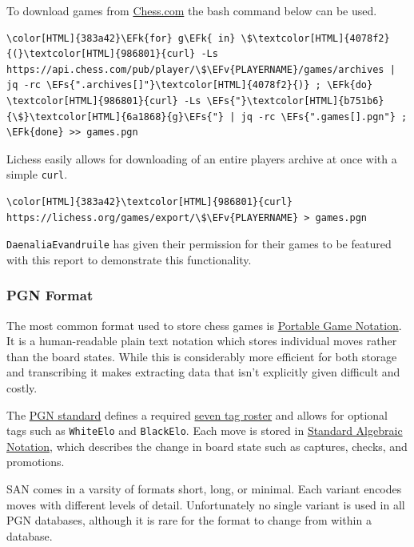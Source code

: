 \documentclass[11pt]{article}
\newcommand{\EFk}[1]{\textcolor{EFk}{#1}} %
\newcommand{\EFs}[1]{\textcolor{EFs}{#1}} %
\newcommand{\EFv}[1]{\textcolor{EFv}{#1}} %
\begin{document}
To download games from \href{https://www.chess.com/}{Chess.com} the bash command below can be used.
\begin{Code}
\begin{Verbatim}[]
\color[HTML]{383a42}\EFk{for} g\EFk{ in} \$\textcolor[HTML]{4078f2}{(}\textcolor[HTML]{986801}{curl} -Ls https://api.chess.com/pub/player/\$\EFv{PLAYERNAME}/games/archives | jq -rc \EFs{".archives[]"}\textcolor[HTML]{4078f2}{)} ; \EFk{do} \textcolor[HTML]{986801}{curl} -Ls \EFs{"}\textcolor[HTML]{b751b6}{\$}\textcolor[HTML]{6a1868}{g}\EFs{"} | jq -rc \EFs{".games[].pgn"} ; \EFk{done} >> games.pgn
\end{Verbatim}
\end{Code}

Lichess easily allows for downloading of an entire players archive at once with a simple \texttt{curl}.
\begin{Code}
\begin{Verbatim}[]
\color[HTML]{383a42}\textcolor[HTML]{986801}{curl} https://lichess.org/games/export/\$\EFv{PLAYERNAME} > games.pgn
\end{Verbatim}
\end{Code}

\texttt{DaenaliaEvandruile} has given their permission for their games to be featured with this report to demonstrate this functionality.
\subsubsection{PGN Format}
\label{sec:org63aa24e}
The most common format used to store chess games is \href{https://en.wikipedia.org/wiki/Portable\_Game\_Notation}{Portable Game Notation}. It is a human-readable plain text notation which stores individual moves rather than the board states. While this is considerably more efficient for both storage and transcribing it makes extracting data that isn't explicitly given difficult and costly.

The \href{http://www.saremba.de/chessgml/standards/pgn/pgn-complete.htm}{PGN standard} defines a required \href{http://www.saremba.de/chessgml/standards/pgn/pgn-complete.htm\#c8.1.1}{seven tag roster} and allows for optional tags such as \texttt{WhiteElo} and \texttt{BlackElo}. Each move is stored in \href{https://en.wikipedia.org/wiki/Algebraic\_notation\_(chess)}{Standard Algebraic Notation}, which describes the change in board state such as captures, checks, and promotions.

SAN comes in a varsity of formats short, long, or minimal. Each variant encodes moves with different levels of detail. Unfortunately no single variant is used in all PGN databases, although it is rare for the format to change from within a database.
\end{document}
